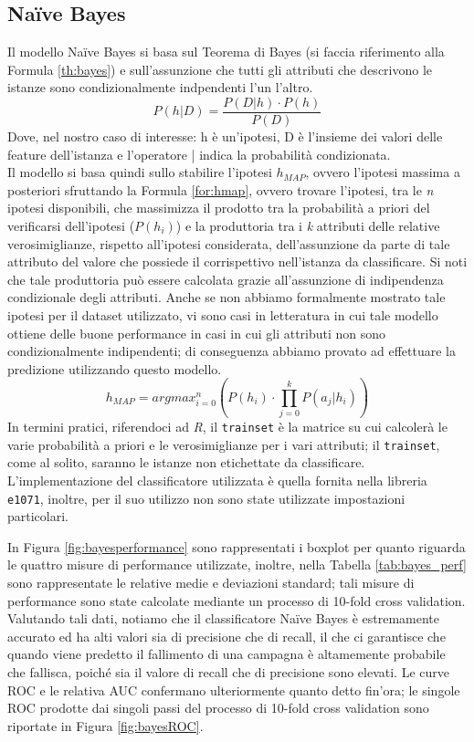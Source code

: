 \subsection{Na\"ive Bayes}
Il modello Na\"ive Bayes si basa sul Teorema di Bayes (si faccia riferimento alla Formula \ref{th:bayes}) e sull'assunzione che tutti gli attributi che descrivono le istanze sono condizionalmente indpendenti l'un l'altro.
\begin{equation}
\label{th:bayes}
P(h|D) = \frac{P(D|h) \cdot P(h)}{P(D)}
\end{equation}
Dove, nel nostro caso di interesse: h è un'ipotesi, D è l'insieme dei valori delle feature dell'istanza e l'operatore | indica la probabilità condizionata.\\
Il modello si basa quindi sullo stabilire l'ipotesi $h_{MAP}$, ovvero l'ipotesi massima a posteriori sfruttando la Formula \ref{for:hmap}, ovvero trovare l'ipotesi, tra le \textit{n} ipotesi disponibili, che massimizza il prodotto tra la probabilità a priori del verificarsi dell'ipotesi ($P(h_{i})$) e la produttoria tra i \textit{k} attributi delle relative verosimiglianze, rispetto all'ipotesi considerata, dell'assunzione da parte di tale attributo del valore che possiede il corrispettivo nell'istanza da classificare. 
Si noti che tale produttoria può essere calcolata grazie all'assunzione di indipendenza condizionale degli attributi.
Anche se non abbiamo formalmente mostrato tale ipotesi per il dataset utilizzato, vi sono casi in letteratura in cui tale modello ottiene delle buone performance in casi in cui gli attributi non sono condizionalmente indipendenti; di conseguenza abbiamo provato ad effettuare la predizione utilizzando questo modello.\\
\begin{equation}
	\label{for:hmap}
	h_{MAP} = argmax_{i = 0}^{n}\left(P(h_{i}) \cdot \prod_{j = 0}^{k}P(a_{j}|h_{i})\right)
\end{equation}
In termini pratici, riferendoci ad \emph{R}, il \texttt{trainset} è la matrice su cui calcolerà le varie probabilità a priori e le verosimiglianze per i vari attributi; il \texttt{trainset}, come al solito, saranno le istanze non etichettate da classificare.
L'implementazione del classificatore utilizzata è quella fornita nella libreria \texttt{e1071}, inoltre, per il suo utilizzo non sono state utilizzate impostazioni particolari.

In Figura \ref{fig:bayesperformance} sono rappresentati i boxplot per quanto riguarda le quattro misure di performance utilizzate, inoltre, nella Tabella \ref{tab:bayes_perf} sono rappresentate le relative medie e deviazioni standard; tali misure di performance sono state calcolate mediante un processo di 10-fold cross validation.
Valutando tali dati, notiamo che il classificatore Na\"ive Bayes è estremamente accurato ed ha alti valori sia di precisione che di recall, il che ci garantisce che quando viene predetto il fallimento di una campagna è altamemente probabile che fallisca, poiché sia il valore di recall che di precisione sono elevati.
Le curve ROC e le relativa AUC confermano ulteriormente quanto detto fin'ora; le singole ROC prodotte dai singoli passi del processo di 10-fold cross validation sono riportate in Figura \ref{fig:bayesROC}.

